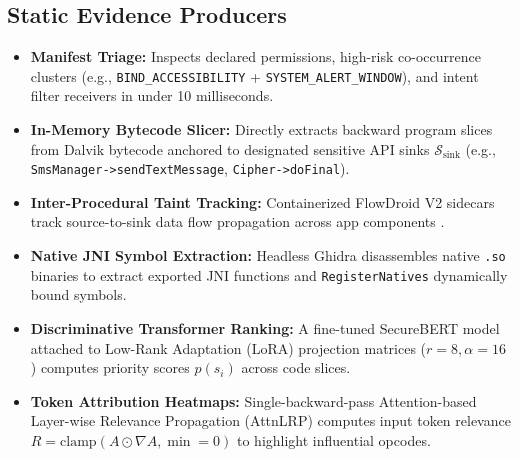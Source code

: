 \documentclass[conference]{IEEEtran}
\begin{document}
\subsection{Static Evidence Producers}
\begin{itemize}
    \item \textbf{Manifest Triage:} Inspects declared permissions, high-risk co-occurrence clusters (e.g., \texttt{BIND\_ACCESSIBILITY} + \texttt{SYSTEM\_ALERT\_WINDOW}), and intent filter receivers in under 10 milliseconds.
    \item \textbf{In-Memory Bytecode Slicer:} Directly extracts backward program slices from Dalvik bytecode anchored to designated sensitive API sinks $\mathcal{S}_{\text{sink}}$ (e.g., \texttt{SmsManager->sendTextMessage}, \texttt{Cipher->doFinal}).
    \item \textbf{Inter-Procedural Taint Tracking:} Containerized FlowDroid V2 sidecars track source-to-sink data flow propagation across app components \cite{b9}.
    \item \textbf{Native JNI Symbol Extraction:} Headless Ghidra disassembles native \texttt{.so} binaries to extract exported JNI functions and \texttt{RegisterNatives} dynamically bound symbols.
    \item \textbf{Discriminative Transformer Ranking:} A fine-tuned SecureBERT model \cite{b5, b13} attached to Low-Rank Adaptation (LoRA) projection matrices ($r=8, \alpha=16$) computes priority scores $p(s_i)$ across code slices.
    \item \textbf{Token Attribution Heatmaps:} Single-backward-pass Attention-based Layer-wise Relevance Propagation (AttnLRP) \cite{b4, b14} computes input token relevance $R = \text{clamp}(A \odot \nabla A, \min=0)$ to highlight influential opcodes.
\end{itemize}
\end{document}
